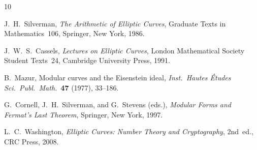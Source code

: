 \documentclass[12pt,a4paper]{amsart}
\theoremstyle{definition}
\begin{document}
\begin{thebibliography}{10}

J.~H.~Silverman,
\emph{The Arithmetic of Elliptic Curves},
Graduate Texts in Mathematics~106,
Springer, New York, 1986.

J.~W.~S.~Cassels,
\emph{Lectures on Elliptic Curves},
London Mathematical Society Student Texts~24,
Cambridge University Press, 1991.

B.~Mazur,
Modular curves and the Eisenstein ideal,
\emph{Inst.\ Hautes \'Etudes Sci.\ Publ.\ Math.}\ \textbf{47} (1977), 33--186.

G.~Cornell, J.~H.~Silverman, and G.~Stevens (eds.),
\emph{Modular Forms and Fermat's Last Theorem},
Springer, New York, 1997.

L.~C.~Washington,
\emph{Elliptic Curves: Number Theory and Cryptography}, 2nd~ed.,
CRC Press, 2008.

\end{thebibliography}
\end{document}
